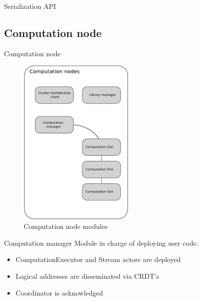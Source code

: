 \documentclass[10pt]{beamer}
\begin{document}
\begin{frame}[fragile]{Serialization API}
  \serializationapi
\end{frame}

\subsection{Computation node}

\begin{frame}[fragile]{Computation node}
\begin{figure}[!h]
  \centering
  \includegraphics[width=0.5\textwidth]{../figures/computationnode.pdf}
  \caption{Computation node modules}
  \label{fig:computationnode}
\end{figure}
\end{frame}




\begin{frame}[fragile]{Computation manager}
  Module in charge of deploying user code.
  \begin{itemize}
  \item ComputationExecutor and Stream actors are deployed
  \item Logical addresses are disseminated via CRDT's
  \item Coordinator is acknowledged
  \end{itemize}
\end{frame}
\end{document}
